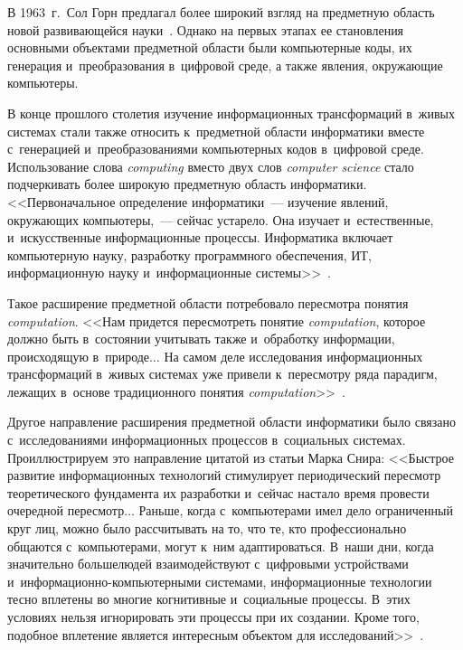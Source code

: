 \begin{multicols}{2}
  В 1963~г.\ Сол Горн предлагал более широкий взгляд на предметную область 
новой развивающейся науки~\cite{8-zat}. Однако на первых этапах ее 
ста\-нов\-ле\-ния основными объектами предметной области были компьютерные 
коды, их генерация и~преобразования в~цифровой среде, а также явления, 
окружающие компьютеры.
  
  В конце прошлого столетия изучение информационных трансформаций 
в~живых системах стали также относить к~предметной области информатики 
вместе с~генерацией и~преобразованиями компьютерных кодов в~цифровой 
среде. Использование слова \textit{computing} вместо двух слов \textit{computer 
science} стало подчеркивать более широкую предметную область 
информатики. <<Первоначальное определение информатики~--- изучение 
явлений, окружающих компьютеры,~--- сейчас устарело. Она изучает 
и~естественные, и~искусственные информационные процессы. Информатика 
включает компьютерную науку, разработку программного обеспечения, 
ИТ, информационную науку и~информационные 
системы>>~\cite{9-zat}.
  
  Такое расширение предметной области потребовало пересмотра понятия 
\textit{computation}. <<Нам придется пересмотреть понятие \textit{computation}, которое 
должно быть в~состоянии учитывать также и~обработку информации, 
происходящую в~природе$\ldots$ На самом деле исследования 
информационных трансформаций в~живых системах уже привели к~пересмотру 
ряда парадигм, лежащих в~основе традиционного понятия 
\textit{computation}>>~\cite{10-zat}.
  
  Другое направление расширения предметной области информатики было 
связано с~исследованиями информационных процессов в~социальных системах. 
Проиллюстрируем это направление цитатой из статьи Марка Снира:
  <<Быстрое развитие информационных технологий стимулирует 
периодический пересмотр теоретического фундамента их разработки и~сейчас 
настало время провести очередной пересмотр$\ldots$ Раньше, когда 
с~компьютерами имел дело ограниченный круг лиц, можно было рассчитывать 
на то, что те, кто профессионально\linebreak
 общаются с~компьютерами, могут к~ним 
адаптироваться. В~наши дни, когда значительно больше\linebreak людей 
взаимодействуют с~цифровыми устройствами  
и~ин\-фор\-ма\-ци\-он\-но-ком\-пью\-тер\-ны\-ми системами, информационные 
технологии тесно вплетены во многие когнитивные и~социальные процессы. 
В~этих условиях нельзя игнорировать эти процессы при их создании. Кроме 
того, подобное вплетение является интересным объектом для 
исследований>>~\cite{11-zat}.


\end{multicols}
